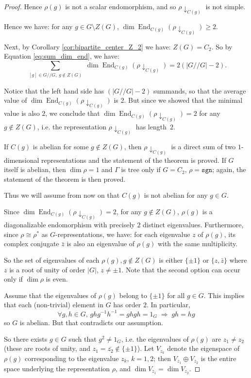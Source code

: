 \documentclass[ALCO]{cedram}
\newcommand{\End}{\operatorname{End}}
\newcommand{\abs}[1]{\left|{#1}\right|}
\newcommand{\sgn}{\mathtt{sgn}}
\begin{document}
\begin{proof}
Hence $\rho(g)$ is not a scalar endomorphism, and so $\rho \downarrow_{C(g)}$ is not simple.
 
Hence we have: for any $g\in G \setminus Z(G)$, $\dim \End_{C(g)}(\rho \downarrow_{C(g)}) \geq 2$. 
 
 
 Next, by Corollary \ref{cor:bipartite_center_Z_2} we have: $Z(G) = C_2$. So by Equation \eqref{eq:sum_dim_end}, we have:
 $$\sum_{\substack{[g] \in G//G,\; g \notin Z(G)}} \dim \End_{C(g)}(\rho \downarrow_{C(g)}) = 2(\abs{G//G} -2).$$
 
 Notice that the left hand side has $(\abs{G//G} -2)$ summands, so that the average value of $\dim \End_{C(g)}(\rho \downarrow_{C(g)}) $ is $2$. But since we showed that the minimal value is also $2$, we conclude that $\dim \End_{C(g)}(\rho \downarrow_{C(g)}) =2$ for any $g\notin Z(G)$, i.e. the representation $\rho \downarrow_{C(g)}$ has length~$2$.
 
 If $C(g)$ is abelian for some $g\notin Z(G)$, then $\rho \downarrow_{C(g)}$ is a direct sum of two $1$-dimensional representations and the statement of the theorem is proved. If $G$ itself is abelian, then $\dim \rho = 1$ and $\Gamma$ is tree only if $G= C_2$, $\rho = \sgn$; again, the statement of the theorem is then proved. 
 
Thus we will assume from now on that $C(g)$ is not abelian for any $g\in G$.
 
Since $\dim \End_{C(g)}(\rho \downarrow_{C(g)}) =2$, for any $g\notin Z(G)$, $\rho(g)$ is a diagonalizable endomorphism with precisely $2$ distinct eigenvalues. Furthermore, since $\rho \cong \rho^*$ as $G$-representations, we have: for each eigenvalue $z$ of $\rho(g)$, its complex conjugate $\bar{z}$ is also an eigenvalue of $\rho(g)$ with the same multiplicity. 

So the set of eigenvalues of each $\rho(g), g\notin Z(G)$ is either $\{\pm 1\}$ or $\{z, \bar{z}\}$ where $z$ is a root of unity of order $\abs{G}$, $z\neq \pm 1$. Note that the second option can occur only if $\dim \rho$ is even.

Assume {that the eigenvalues of $\rho(g)$ belong to $\{\pm 1\}$ for all $g\in G$}. This implies that each {(non-trivial)} element in $G$ has order $2$. In particular, $$\forall g, h\in G, \, ghg^{-1}h^{-1} = ghgh=1_G \; \Rightarrow \; gh=hg$$ so $G$ is abelian. But that contradicts our assumption. 

So there exists $g \in G$ such that $g^2 \neq 1_G$, i.e. the eigenvalues of $\rho(g)$ are $z_1 \neq z_2$ (these are roots of unity, and $z_1 =\bar{z_2} { \notin \{\pm 1\}}$). Let $V_{z_k}$ denote the eigenspace of $\rho(g)$ corresponding to the eigenvalue $z_k$, $k=1,2$; then $V_{z_1} \oplus V_{z_2}$ is the entire space underlying the representation $\rho$, and $\dim V_{z_1} = \dim V_{z_2}$. 


\end{proof}
\end{document}
